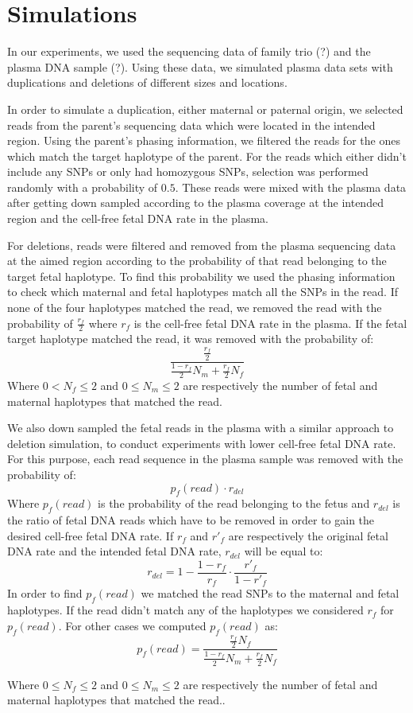 \section{Simulations}
	In our experiments, we used the sequencing data of family trio (?) and the plasma DNA sample (?). Using these data, we simulated plasma data sets with duplications and deletions of different sizes and locations.

	In order to simulate a duplication, either maternal or paternal origin, we selected reads from the parent's sequencing data which were located in the intended region. Using the parent's phasing information, we filtered the reads for the ones which match the target haplotype of the parent. For the reads which either didn't include any SNPs or only had homozygous SNPs, selection was performed randomly with a probability of $0.5$. These reads were mixed with the plasma data after getting down sampled according to the plasma coverage at the intended region and the cell-free fetal DNA rate in the plasma.
	
	For deletions, reads were filtered and removed from the plasma sequencing data at the aimed region according to the probability of that read belonging to the target fetal haplotype. To find this probability we used the phasing information to check which maternal and fetal haplotypes match all the SNPs in the read. If none of the four haplotypes matched the read, we removed the read with the probability of $\frac{r_f}{2}$ where $r_f$ is the cell-free fetal DNA rate in the plasma. If the fetal target haplotype matched the read, it was removed with the probability of:
	$$\frac{ \frac{r_f}{2} } { \frac{1-r_f}{2} N_m + \frac{r_f}{2} N_f}$$
	Where $0 < N_f \leq 2$ and $0 \leq N_m \leq 2$ are respectively the number of fetal and maternal haplotypes that matched the read.
	
	We also down sampled the fetal reads in the plasma with a similar approach to deletion simulation, to conduct experiments with lower cell-free fetal DNA rate. For this purpose, each read sequence in the plasma sample was removed with the probability of:
	 $$p_f(read) \cdot r_{del}$$
	 Where $p_f(read)$ is the probability of the read belonging to the fetus and $r_{del}$ is the ratio of fetal DNA reads which have to be removed in order to gain the desired cell-free fetal DNA rate. If $r_f$ and $r'_f$ are respectively the original fetal DNA rate and the intended fetal DNA rate, $r_{del}$ will be equal to:
	 $$r_{del}= 1 - \frac{1 - r_f } { r_f} \cdot \frac{r'_f}{1-r'_f}$$
	 In order to find $p_f(read)$ we matched the read SNPs to the maternal and fetal haplotypes. If the read didn't match any of the haplotypes we considered $r_f$ for $p_f(read)$. For other cases we computed $p_f(read)$ as:
	 $$p_f(read)= \frac{ \frac{r_f}{2}N_f } { \frac{1-r_f}{2} N_m + \frac{r_f}{2} N_f}$$
	 	 
	Where $0 \leq N_f \leq 2$ and $0 \leq N_m \leq 2$ are respectively the number of fetal and maternal haplotypes that matched the read..
